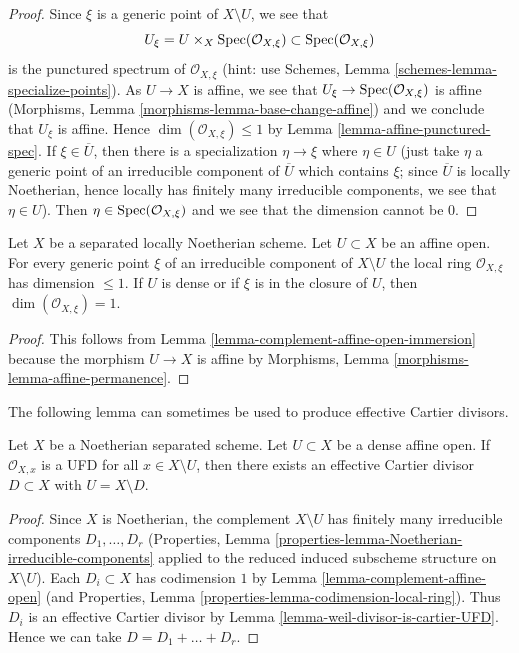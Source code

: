 \begin{proof}
Since $\xi$ is a generic point of $X \setminus U$, we see that
$$
U_\xi = U \times_X \mathop{\mathrm{Spec}}(\mathcal{O}_{X, \xi}) \subset
\mathop{\mathrm{Spec}}(\mathcal{O}_{X, \xi})
$$
is the punctured spectrum of $\mathcal{O}_{X, \xi}$ (hint: use
Schemes, Lemma \ref{schemes-lemma-specialize-points}).
As $U \to X$ is affine, we see that $U_\xi \to \mathop{\mathrm{Spec}}(\mathcal{O}_{X, \xi})$
is affine (Morphisms, Lemma \ref{morphisms-lemma-base-change-affine})
and we conclude that $U_\xi$ is affine.
Hence $\dim(\mathcal{O}_{X, \xi}) \leq 1$ by
Lemma \ref{lemma-affine-punctured-spec}.
If $\xi \in \overline{U}$, then there is a specialization
$\eta \to \xi$ where $\eta \in U$ (just take $\eta$ a generic
point of an irreducible component of $\overline{U}$ which
contains $\xi$; since $\overline{U}$ is locally Noetherian,
hence locally has finitely many irreducible components, we see that
$\eta \in U$). Then $\eta \in \mathop{\mathrm{Spec}}(\mathcal{O}_{X, \xi})$ and
we see that the dimension cannot be $0$.
\end{proof}

\begin{lemma}
\label{lemma-complement-affine-open}
Let $X$ be a separated locally Noetherian scheme. Let $U \subset X$ be an
affine open. For every generic point $\xi$ of an irreducible component of
$X \setminus U$ the local ring $\mathcal{O}_{X, \xi}$
has dimension $\leq 1$. If $U$ is dense or if $\xi$ is in the closure
of $U$, then $\dim(\mathcal{O}_{X, \xi}) = 1$.
\end{lemma}

\begin{proof}
This follows from Lemma \ref{lemma-complement-affine-open-immersion}
because the morphism $U \to X$ is affine by
Morphisms, Lemma \ref{morphisms-lemma-affine-permanence}.
\end{proof}

\noindent
The following lemma can sometimes be used to produce effective
Cartier divisors.

\begin{lemma}
\label{lemma-complement-open-affine-effective-cartier-divisor}
Let $X$ be a Noetherian separated scheme. Let $U \subset X$ be
a dense affine open. If $\mathcal{O}_{X, x}$ is a UFD for all
$x \in X \setminus U$, then there exists an effective Cartier
divisor $D \subset X$ with $U = X \setminus D$.
\end{lemma}

\begin{proof}
Since $X$ is Noetherian, the complement $X \setminus U$ has finitely
many irreducible components $D_1, \ldots, D_r$
(Properties, Lemma \ref{properties-lemma-Noetherian-irreducible-components}
applied to the reduced induced subscheme structure on $X \setminus U$).
Each $D_i \subset X$ has codimension $1$ by
Lemma \ref{lemma-complement-affine-open}
(and Properties, Lemma \ref{properties-lemma-codimension-local-ring}).
Thus $D_i$ is an effective Cartier divisor by
Lemma \ref{lemma-weil-divisor-is-cartier-UFD}.
Hence we can take $D = D_1 + \ldots + D_r$.
\end{proof}

